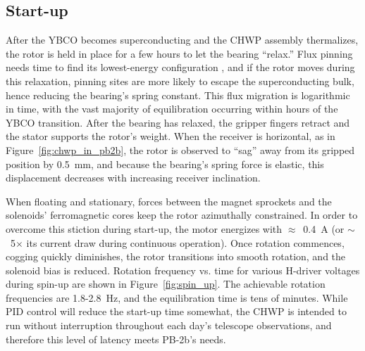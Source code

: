 
\subsection{Start-up}
\label{sec:pb2a_chwp_evaluation_start_up}

After the YBCO becomes superconducting and the CHWP assembly thermalizes, the rotor is held in place for a few hours to let the bearing ``relax.'' Flux pinning needs time to find its lowest-energy configuration \cite{postrekhin_dynamics_2001}, and if the rotor moves during this relaxation, pinning sites are more likely to escape the superconducting bulk, hence reducing the bearing's spring constant. This flux migration is logarithmic in time, with the vast majority of equilibration occurring within hours of the YBCO transition. After the bearing has relaxed, the gripper fingers retract and the stator supports the rotor's weight. When the receiver is horizontal, as in Figure~\ref{fig:chwp_in_pb2b}, the rotor is observed to ``sag'' away from its gripped position by 0.5~mm, and because the bearing's spring force is elastic, this displacement decreases with increasing receiver inclination.

When floating and stationary, forces between the magnet sprockets and the solenoids' ferromagnetic cores keep the rotor azimuthally constrained. In order to overcome this stiction during start-up, the motor energizes with $\approx$~0.4~A (or $\sim$~5$\times$ its current draw during continuous operation). Once rotation commences, cogging quickly diminishes, the rotor transitions into smooth rotation, and the solenoid bias is reduced. Rotation frequency vs. time for various H-driver voltages during spin-up are shown in Figure~\ref{fig:spin_up}. The achievable rotation frequencies are 1.8-2.8~Hz, and the equilibration time is tens of minutes. While PID control will reduce the start-up time somewhat, the CHWP is intended to run without interruption throughout each day's telescope observations, and therefore this level of latency meets PB-2b's needs.

